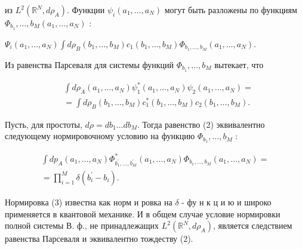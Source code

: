 \documentclass[10pt]{article}
\begin{document}
из $L^{2}\left(\mathbb{R}^{N}, d \rho_{A}\right)$. Функции $\psi_{i}\left(a_{1}, \ldots, a_{N}\right)$ могут быть разложены по функциям $\Phi_{b_{1}}, \ldots, b_{M}\left(a_{1}, \ldots, a_{N}\right)$ :



$\Psi_{i}\left(a_{1}, \ldots, a_{N}\right) \int d \rho_{B}\left(b_{1}, \ldots, b_{M}\right) c_{1}\left(b_{1}, \ldots, b_{M}\right) \Phi_{b_{1}, \ldots, b_{M}}\left(a_{1}, \ldots, a_{N}\right)$.



Из равенства Парсеваля для системы функций $\Phi_{b_{1}}, \ldots, b_{M}$ вытекает, что



\[

\begin{aligned}

& \int d \rho_{A}\left(a_{1}, \ldots, a_{N}\right) \psi_{1}^{*}\left(a_{1}, \ldots, a_{N}\right) \psi_{2}\left(a_{1}, \ldots, a_{N}\right)= \\

& =\int d \rho_{B}\left(b_{1}, \ldots, b_{M}\right) c_{1}^{*}\left(b_{1}, \ldots, b_{M}\right) c_{2}\left(b_{1}, \ldots, b_{M}\right) .

\end{aligned}

\]



Пусть, для простоты, $d \rho=d b_{1} \ldots d b_{M}$. Тогда равенство (2) эквивалентно следующему нормировочному условию на функцию $\Phi_{b_{1}}, \ldots, b_{M}$ :



\[

\begin{gathered}

\int d p_{A}\left(a_{1}, \ldots, a_{N}\right) \Phi_{b_{1}^{\prime}, \ldots, b_{M}^{\prime}}^{*}\left(a_{1}, \ldots, a_{N}\right) \Phi_{b_{1}, \ldots, b_{M}}\left(a_{1}, \ldots, a_{N}\right)= \\

=\prod_{i=1}^{M} \delta\left(b_{i}^{\prime}-b_{i}\right) .

\end{gathered}

\]



Нормировка (3) известна как норм и ровка на $\delta$ - фу н к ц и ю и широко применяется в квантовой механике. И в общем случае условие нормировки полной системы В. ф., не принадлежащих $L^{2}\left(\mathbb{R}^{N}, d \rho_{A}\right)$, является следствием равенства Парсеваля и эквивалентно тождеству (2).
\end{document}
